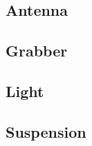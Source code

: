 \newcommand{\ExplodedView}[1]{
 \subsection{#1}
  
}

\newcommand{\ExplodedViewDrawing}[2]{
\begin{figure}[!ht]
    \centering
    \texttt{[image: \#1]}
    \caption{#2}
\end{figure}
}

\ExplodedView{Antenna}
\clearpage
\ExplodedView{Grabber}
\clearpage
\ExplodedView{Light}
\clearpage
\ExplodedView{Suspension}
